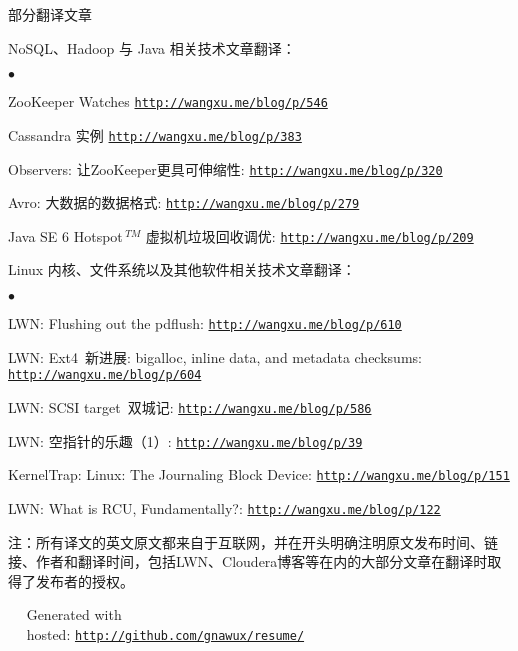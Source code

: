 \documentclass[margin,line]{res}
\newenvironment{list1}{
  \begin{list}{\ding{113}}{%
      \setlength{\itemsep}{0in}
      \setlength{\parsep}{0in} \setlength{\parskip}{0in}
      \setlength{\topsep}{0in} \setlength{\partopsep}{0in} 
      \setlength{\leftmargin}{0.17in}}}{\end{list}}
\newenvironment{list2}{
  \begin{list}{$\bullet$}{%
      \setlength{\itemsep}{0in}
      \setlength{\parsep}{0in} \setlength{\parskip}{0in}
      \setlength{\topsep}{0in} \setlength{\partopsep}{0in} 
      \setlength{\leftmargin}{0.2in}}}{\end{list}}
\newcommand{\http}{http:/\hspace{-0.3ex}/}
\newcommand{\hindent}{\mbox{\hspace{8ex}}}
\begin{document}
\begin{resume}
\textsf{部分翻译文章}\\
\vspace*{-.1in}
\begin{list1}
\item[] NoSQL、Hadoop 与 Java 相关技术文章翻译：
\begin{list2}
\vspace*{.05in}
\item ZooKeeper Watches \href{http://wangxu.me/blog/p/546}{\tt\http{}wangxu.me/blog/p/546}
\item Cassandra 实例 \href{http://wangxu.me/blog/p/383}{\tt\http{}wangxu.me/blog/p/383}
\item Observers: 让ZooKeeper更具可伸缩性: \href{http://wangxu.me/blog/p/320}{\tt\http{}wangxu.me/blog/p/320}
\item Avro: 大数据的数据格式: \href{http://wangxu.me/blog/p/279}{\tt\http{}wangxu.me/blog/p/279}
\item Java SE 6 Hotspot${\,}^{TM}$ 虚拟机垃圾回收调优: \href{http://wangxu.me/blog/p/209}{\tt\http{}wangxu.me/blog/p/209}
\vspace*{.05in}
\end{list2}
\item[] Linux 内核、文件系统以及其他软件相关技术文章翻译：
\begin{list2}
\vspace*{.05in}
\item LWN: Flushing out the pdflush: \href{http://wangxu.me/blog/p/610}{\tt\http{}wangxu.me/blog/p/610}
\item LWN: Ext4~新进展: bigalloc, inline data, and metadata checksums: \\ \hindent \href{http://wangxu.me/blog/p/604}{\tt\http{}wangxu.me/blog/p/604}
\item LWN: SCSI target~双城记: \href{http://wangxu.me/blog/p/586}{\tt \http{}wangxu.me/blog/p/586}
\item LWN: 空指针的乐趣（1）: \href{http://wangxu.me/blog/p/39}{\tt\http{}wangxu.me/blog/p/39}
\item KernelTrap: Linux: The Journaling Block Device: \href{http://wangxu.me/blog/p/151}{\tt\http{}wangxu.me/blog/p/151}
\item LWN: What is RCU, Fundamentally?: \href{http://wangxu.me/blog/p/122}{\tt\http{}wangxu.me/blog/p/122}
\end{list2}
\end{list1}
{\small \textsf{注：所有译文的英文原文都来自于互联网，并在开头明确注明原文发布时间、链接、作者和翻译时间，包括LWN、Cloudera博客等在内的大部分文章在翻译时取得了发布者的授权。}}

\end{resume}

\vfill
\vfill
\mbox{ }\hspace{100pt}	\small\Resume\ Generated with \\
\mbox{ }\hspace{60pt}	\small\Resume\ hosted: \href{http://github.com/gnawux/resume/}{\tt\http{}github.com/gnawux/resume/}
\end{document}
